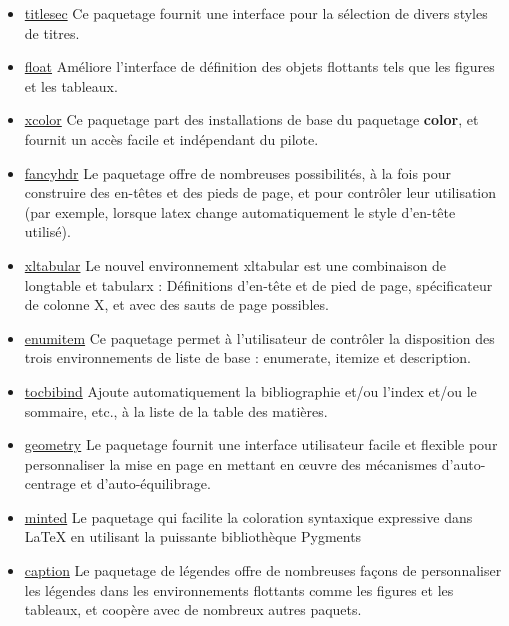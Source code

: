 \begin{itemize}
    \item \href{https://www.ctan.org/pkg/titlesec}{titlesec} Ce paquetage fournit une interface pour la sélection de
          divers styles de titres.
    \item \href{https://www.ctan.org/pkg/float}{float} Améliore l'interface de définition des objets flottants
          tels que les figures et les tableaux.
    \item \href{https://www.ctan.org/pkg/xcolor}{xcolor} Ce paquetage part des installations de base
          du paquetage \textbf{color}, et fournit un accès facile et indépendant du pilote.
    \item \href{https://www.ctan.org/pkg/fancyhdr}{fancyhdr} Le paquetage offre de nombreuses possibilités,
          à la fois pour construire des en-têtes et des pieds de page, et pour contrôler leur
          utilisation (par exemple, lorsque \gls{latex} change automatiquement le style d'en-tête utilisé).
    \item \href{https://www.ctan.org/pkg/xltabular}{xltabular} Le nouvel environnement xltabular est une combinaison
          de longtable et tabularx : Définitions d'en-tête et de pied de page, spécificateur de colonne X,
          et avec des sauts de page possibles.
    \item \href{https://www.ctan.org/pkg/enumitem}{enumitem} Ce paquetage permet à l'utilisateur de contrôler
          la disposition des trois environnements de liste de base : enumerate, itemize et description.
    \item \href{https://www.ctan.org/pkg/tocbibind}{tocbibind} Ajoute automatiquement la bibliographie et/ou
          l'index et/ou le sommaire, etc., à la liste de la table des matières.
    \item \href{https://www.ctan.org/pkg/geometry}{geometry} Le paquetage fournit une interface
          utilisateur facile et flexible pour personnaliser la mise en page en mettant en œuvre des mécanismes
          d'auto-centrage et d'auto-équilibrage.
    \item \href{https://www.ctan.org/pkg/minted}{minted} Le paquetage qui facilite la coloration syntaxique expressive dans
          LaTeX en utilisant la puissante bibliothèque Pygments
    \item \href{https://www.ctan.org/pkg/caption}{caption} Le paquetage de légendes offre de nombreuses façons de
          personnaliser les légendes dans les environnements flottants comme les figures et les tableaux, et coopère
          avec de nombreux autres paquets.
\end{itemize}

